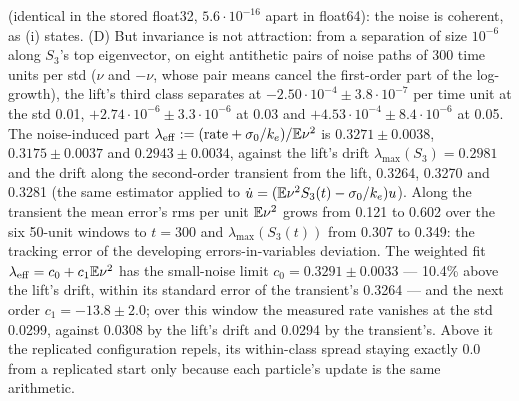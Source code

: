 \begin{sloppypar}
(identical in the stored float32, $5.6\cdot10^{-16}$ apart in float64): the noise is coherent, as (i) states. (D) But
invariance is not attraction: from a separation of size $10^{-6}$ along $S_3$'s top eigenvector, on eight antithetic
pairs of noise paths of 300 time units per std ($\nu$ and $-\nu$, whose pair means cancel the first-order part of the
log-growth), the lift's third class separates at $-2.50\cdot10^{-4}\pm3.8\cdot10^{-7}$ per time unit at the std
0.01, $+2.74\cdot10^{-6}\pm3.3\cdot10^{-6}$ at 0.03 and $+4.53\cdot10^{-4}\pm8.4\cdot10^{-6}$ at 0.05. The
noise-induced part $\lambda_{\mathrm{eff}} := (\mathrm{rate} + \sigma_0/k_e)/\mathbb{E}\nu^2$ is $0.3271\pm0.0038$,
$0.3175\pm0.0037$ and $0.2943\pm0.0034$, against the lift's drift $\lambda_{\max}(S_3) = 0.2981$ and the drift along
the second-order transient from the lift, 0.3264, 0.3270 and 0.3281 (the same estimator applied to
$\dot u = (\mathbb{E}\nu^2S_3(t) - \sigma_0/k_e)u$). Along the transient the mean error's rms per unit $\mathbb{E}\nu^2$ grows from
0.121 to 0.602 over the six 50-unit windows to $t = 300$ and $\lambda_{\max}(S_3(t))$ from 0.307 to 0.349: the
tracking error of the developing errors-in-variables deviation. The weighted fit
$\lambda_{\mathrm{eff}} = c_0 + c_1\mathbb{E}\nu^2$ has the small-noise limit $c_0 = 0.3291\pm0.0033$ --- 10.4\% above the
lift's drift, within its standard error of the transient's 0.3264 --- and the next order $c_1 = -13.8\pm2.0$; over
this window the measured rate vanishes at the std 0.0299, against 0.0308 by the lift's drift and 0.0294 by the
transient's. Above it the replicated configuration repels, its within-class spread staying exactly 0.0 from a
replicated start only because each particle's update is the same arithmetic.
\end{sloppypar}

